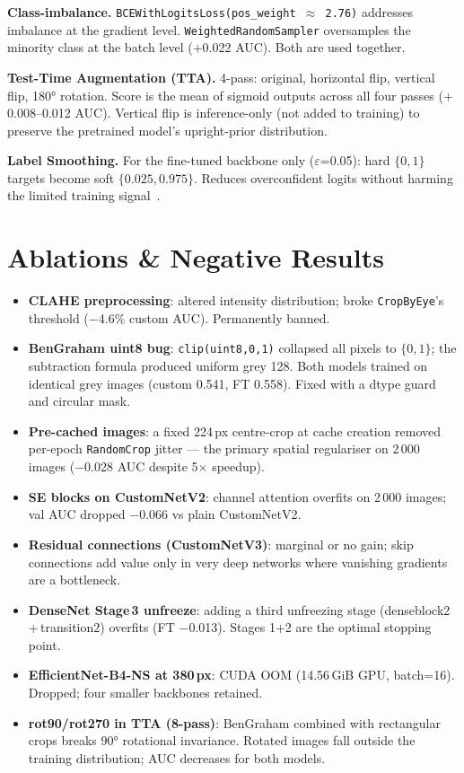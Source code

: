 \documentclass[a4paper, 10pt, twocolumn]{article}
\begin{document}
\textbf{Class-imbalance.}
\texttt{BCEWithLogitsLoss(pos\_weight\,$\approx$\,2.76)} addresses imbalance
at the gradient level. \texttt{WeightedRandomSampler} oversamples the
minority class at the batch level ($+$0.022 AUC). Both are used together.

\textbf{Test-Time Augmentation (TTA).}
4-pass: original, horizontal flip, vertical flip, 180° rotation.
Score is the mean of sigmoid outputs across all four passes
($+$0.008--0.012 AUC). Vertical flip is inference-only (not added to
training) to preserve the pretrained model's upright-prior distribution.

\textbf{Label Smoothing.}
For the fine-tuned backbone only ($\varepsilon$=0.05): hard $\{0,1\}$
targets become soft $\{0.025, 0.975\}$. Reduces overconfident logits
without harming the limited training signal~\cite{muller2019label}.


\section{Ablations \& Negative Results}

\begin{itemize}
  \item \textbf{CLAHE preprocessing}: altered intensity distribution;
    broke \texttt{CropByEye}'s threshold ($-$4.6\% custom AUC).
    Permanently banned.
  \item \textbf{BenGraham uint8 bug}: \texttt{clip(uint8,0,1)} collapsed
    all pixels to $\{0,1\}$; the subtraction formula produced uniform grey 128.
    Both models trained on identical grey images (custom 0.541, FT 0.558).
    Fixed with a dtype guard and circular mask.
  \item \textbf{Pre-cached images}: a fixed 224\,px centre-crop at cache
    creation removed per-epoch \texttt{RandomCrop} jitter — the primary
    spatial regulariser on 2\,000 images ($-$0.028 AUC despite 5$\times$ speedup).
  \item \textbf{SE blocks on CustomNetV2}: channel attention overfits on
    2\,000 images; val AUC dropped $-$0.066 vs plain CustomNetV2.
  \item \textbf{Residual connections (CustomNetV3)}: marginal or no gain;
    skip connections add value only in very deep networks where vanishing
    gradients are a bottleneck.
  \item \textbf{DenseNet Stage\,3 unfreeze}: adding a third unfreezing stage
    (denseblock2\,+\,transition2) overfits (FT $-$0.013). Stages 1+2 are
    the optimal stopping point.
  \item \textbf{EfficientNet-B4-NS at 380\,px}: CUDA OOM (14.56\,GiB GPU,
    batch=16). Dropped; four smaller backbones retained.
  \item \textbf{rot90/rot270 in TTA (8-pass)}: BenGraham combined with
    rectangular crops breaks 90° rotational invariance. Rotated images
    fall outside the training distribution; AUC decreases for both models.
\end{itemize}
\end{document}
